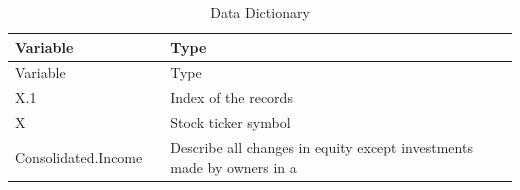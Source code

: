 \documentclass[11pt,]{article}
\begin{document}
\begin{longtable}[]{@{}lll@{}}
\caption{Data Dictionary}\tabularnewline
\toprule
\begin{minipage}[b]{0.19\columnwidth}\raggedright
Variable\strut
\end{minipage} & \begin{minipage}[b]{0.10\columnwidth}\raggedright
\strut
\end{minipage} & \begin{minipage}[b]{0.62\columnwidth}\raggedright
Type\strut
\end{minipage}\tabularnewline
\midrule
\endfirsthead
\toprule
\begin{minipage}[b]{0.19\columnwidth}\raggedright
Variable\strut
\end{minipage} & \begin{minipage}[b]{0.10\columnwidth}\raggedright
\strut
\end{minipage} & \begin{minipage}[b]{0.62\columnwidth}\raggedright
Type\strut
\end{minipage}\tabularnewline
\midrule
\endhead
\begin{minipage}[t]{0.19\columnwidth}\raggedright
X.1\strut
\end{minipage} & \begin{minipage}[t]{0.10\columnwidth}\raggedright
\strut
\end{minipage} & \begin{minipage}[t]{0.62\columnwidth}\raggedright
Index of the records\strut
\end{minipage}\tabularnewline
\begin{minipage}[t]{0.19\columnwidth}\raggedright
X\strut
\end{minipage} & \begin{minipage}[t]{0.10\columnwidth}\raggedright
\strut
\end{minipage} & \begin{minipage}[t]{0.62\columnwidth}\raggedright
Stock ticker symbol\strut
\end{minipage}\tabularnewline
\begin{minipage}[t]{0.19\columnwidth}\raggedright
Consolidated.Income\strut
\end{minipage} & \begin{minipage}[t]{0.10\columnwidth}\raggedright
\strut
\end{minipage} & \begin{minipage}[t]{0.62\columnwidth}\raggedright
Describe all changes in equity except investments made by owners in a

\end{minipage}
\end{longtable}
\end{document}
